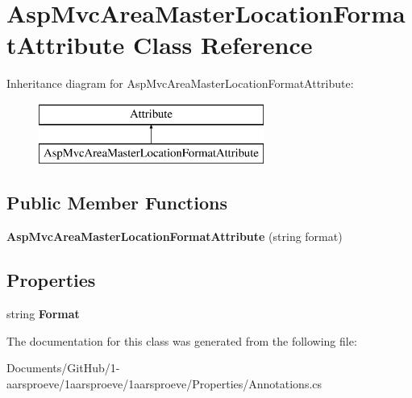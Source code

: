 \hypertarget{class_asp_mvc_area_master_location_format_attribute}{}\section{Asp\+Mvc\+Area\+Master\+Location\+Format\+Attribute Class Reference}
\label{class_asp_mvc_area_master_location_format_attribute}
Inheritance diagram for Asp\+Mvc\+Area\+Master\+Location\+Format\+Attribute\+:\begin{figure}[H]
\begin{center}
\leavevmode
\includegraphics[height=2.000000cm]{class_asp_mvc_area_master_location_format_attribute}
\end{center}
\end{figure}
\subsection*{Public Member Functions}
\begin{DoxyCompactItemize}
\item 
\hypertarget{class_asp_mvc_area_master_location_format_attribute_ab46b99bdef3d52b97af74a67590c2aab}{}{\bfseries Asp\+Mvc\+Area\+Master\+Location\+Format\+Attribute} (string format)\label{class_asp_mvc_area_master_location_format_attribute_ab46b99bdef3d52b97af74a67590c2aab}

\end{DoxyCompactItemize}
\subsection*{Properties}
\begin{DoxyCompactItemize}
\item 
\hypertarget{class_asp_mvc_area_master_location_format_attribute_a4cb37b1a8f40ba0e5285cd1e602cf1c3}{}string {\bfseries Format}\label{class_asp_mvc_area_master_location_format_attribute_a4cb37b1a8f40ba0e5285cd1e602cf1c3}

\end{DoxyCompactItemize}


The documentation for this class was generated from the following file\+:\begin{DoxyCompactItemize}
\item 
Documents/\+Git\+Hub/1-\/aarsproeve/1aarsproeve/1aarsproeve/\+Properties/Annotations.\+cs\end{DoxyCompactItemize}
